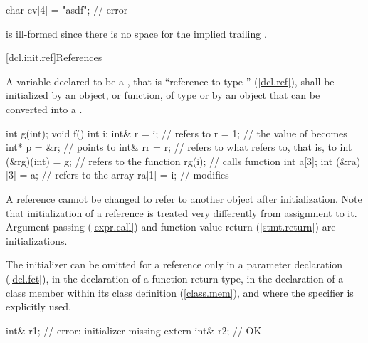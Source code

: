 \begin{codeblock}
char cv[4] = "asdf";            // error
\end{codeblock}

is ill-formed since there is no space for the implied trailing
.
\exitexample

[dcl.init.ref]{References}%

\pnum
A variable declared to be a
,
that is ``reference to type
''
(\ref{dcl.ref}),
shall be initialized by an object, or function, of type
or by an object that can be converted into a
.
\enterexample

\begin{codeblock}
int g(int);
void f()
{
    int i;
    int& r = i;                 //  refers to 
    r = 1;                      // the value of  becomes 
    int* p = &r;                //  points to 
    int& rr = r;                //  refers to what  refers to, that is, to 
    int (&rg)(int) = g;         //  refers to the function 
    rg(i);                      // calls function 
    int a[3];
    int (&ra)[3] = a;           //  refers to the array 
    ra[1] = i;                  // modifies 
}
\end{codeblock}
\exitexampleb

\pnum
A reference cannot be changed to refer to another object after initialization.
%
Note that initialization of a reference is treated very differently from assignment
to it.
%
Argument passing (\ref{expr.call})
%
and function value return (\ref{stmt.return}) are initializations.

\pnum
The initializer can be omitted for a reference only in a parameter declaration
(\ref{dcl.fct}), in the declaration of a function return type, in the declaration of
a class member within its class definition (\ref{class.mem}), and where the
specifier is explicitly used.
%
\enterexample

\begin{codeblock}
int& r1;                        // error: initializer missing
extern int& r2;                 // OK
\end{codeblock}
\exitexampleb

